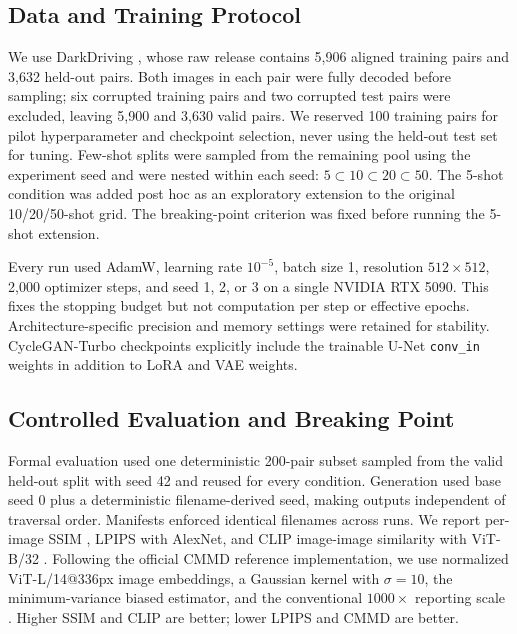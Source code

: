 \documentclass{article}
\begin{document}
\subsection{Data and Training Protocol}

We use DarkDriving \cite{wang2026darkdriving}, whose raw release contains 5,906 aligned training pairs and 3,632 held-out pairs. Both images in each pair were fully decoded before sampling; six corrupted training pairs and two corrupted test pairs were excluded, leaving 5,900 and 3,630 valid pairs. We reserved 100 training pairs for pilot hyperparameter and checkpoint selection, never using the held-out test set for tuning. Few-shot splits were sampled from the remaining pool using the experiment seed and were nested within each seed: $5\subset10\subset20\subset50$. The 5-shot condition was added post hoc as an exploratory extension to the original 10/20/50-shot grid. The breaking-point criterion was fixed before running the 5-shot extension.

Every run used AdamW, learning rate $10^{-5}$, batch size 1, resolution $512\times512$, 2,000 optimizer steps, and seed 1, 2, or 3 on a single NVIDIA RTX 5090. This fixes the stopping budget but not computation per step or effective epochs. Architecture-specific precision and memory settings were retained for stability. CycleGAN-Turbo checkpoints explicitly include the trainable U-Net \texttt{conv\_in} weights in addition to LoRA and VAE weights.

\subsection{Controlled Evaluation and Breaking Point}

Formal evaluation used one deterministic 200-pair subset sampled from the valid held-out split with seed 42 and reused for every condition. Generation used base seed 0 plus a deterministic filename-derived seed, making outputs independent of traversal order. Manifests enforced identical filenames across runs. We report per-image SSIM \cite{wang2004image}, LPIPS with AlexNet, and CLIP image-image similarity with ViT-B/32 \cite{radford2021learning}. Following the official CMMD reference implementation, we use normalized ViT-L/14@336px image embeddings, a Gaussian kernel with $\sigma=10$, the minimum-variance biased estimator, and the conventional $1000\times$ reporting scale \cite{jayasumana2024rethinking}. Higher SSIM and CLIP are better; lower LPIPS and CMMD are better.
\end{document}
